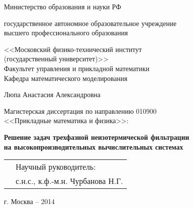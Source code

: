 \begin{titlepage}
\begin{center}
{Министерство образования и науки РФ} \\
\vspace{7mm}
{ государственное автономное образовательное учреждение \\
высшего профессионального образования\par}
\vspace{1.5mm}
{<<Московский физико-технический институт \\
(государственный университет)>>} \\
\vspace{1.5mm}
Факультет управления и прикладной математики \\
Кафедра математического моделирования \par
\vspace{40mm}
{Люпа Анастасия Александровна\par}
\vspace{10mm}
{Магистерская диссертация по направлению 010900 \\
<<Прикладные математика и физика>>:\par}

\vspace{10mm}

{\bf \large Решение задач трехфазной неизотермической фильтрации \\
на высокопроизводительных вычислительных системах\par}

\end{center}

\vspace{40mm}
\begin{flushright}
  \begin{tabularx}{\textwidth}{XX}
    &Научный руководитель: \\
    &с.н.с., к.ф.-м.н. Чурбанова Н.Г.
  \end{tabularx}
\end{flushright}
 
\vspace{\fill}

\begin{center}
{г. Москва -- 2014}
\end{center}

\clearpage
\end{titlepage}
\newpage